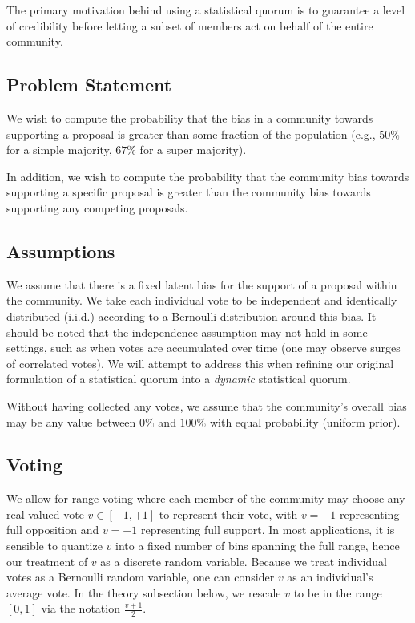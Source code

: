 \documentclass[format=acmsmall, review=true, screen=true, anonymous=true]{acmart}
\begin{document}
The primary motivation behind using a statistical quorum is to guarantee a level of credibility before letting a subset of members act on behalf of the entire community.

\subsection{Problem Statement}
We wish to compute the probability that the bias in a community towards supporting a proposal is greater than some
fraction of the population (e.g., $50\%$ for a simple majority, $67\%$ for a super majority).

In addition, we wish to compute the probability that the community bias towards supporting a specific proposal is greater than the community bias towards supporting any competing proposals.

\subsection{Assumptions}
We assume that there is a fixed latent bias for the support of a proposal within the community.  We take each individual vote to be independent and identically distributed (i.i.d.) according to a Bernoulli distribution around this bias.  It should be noted that the independence assumption may not hold in some settings, such as when votes are accumulated over time (one may observe surges of correlated votes).  We will attempt to address this when refining our original formulation of a statistical quorum into a \textit{dynamic} statistical quorum.

Without having collected any votes, we assume that the community's overall bias may be any value between $0\%$ and $100\%$ with equal probability (uniform prior).

\subsection{Voting}


We allow for range voting where each member of the community may choose any real-valued vote $v \in [-1,+1]$ to
represent their vote, with $v = -1$ representing full opposition and $v=+1$ representing full support.  In most applications, it is sensible to quantize $v$ into a fixed number of bins spanning the full range, hence our treatment of $v$ as a discrete random variable.  Because we treat individual votes as a Bernoulli random variable, one can consider $v$ as an individual's average vote.  In the theory subsection below, we rescale $v$ to be in the range $[0,1]$ via the notation $\frac{v + 1}{2}$.
\end{document}
